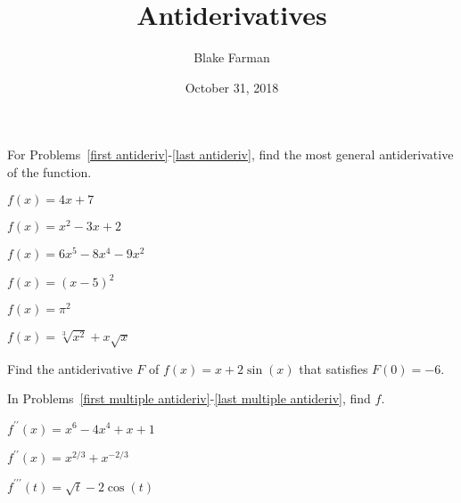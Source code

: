 \documentclass[10pt]{amsart}
\title{Antiderivatives}
\date{October 31, 2018}
\author{Blake Farman}
\begin{document}
\maketitle

\makenameslot

For Problems~\eqref{first antideriv}-\eqref{last antideriv}, find the most general antiderivative of the function.
\begin{multicols}{3}
\begin{thm}\label{first antideriv}
  \(f(x) = 4x + 7\)
\end{thm}

\begin{thm}
  \(f(x) = x^2 - 3x + 2\)
\end{thm}

\begin{thm}
  \(f(x) = 6x^5 - 8x^4 - 9x^2\)
\end{thm}
\end{multicols}

\vspace{2in}

\begin{multicols}{3}
  \begin{thm}
    \(f(x) = (x - 5)^2\)
  \end{thm}

  \begin{thm}
    \(f(x) = \pi^2\)
  \end{thm}

  \begin{thm}\label{last antideriv}
    \(f(x) = \sqrt[3]{x^2} + x\sqrt{x}\)
  \end{thm}
\end{multicols}

\newpage

\begin{thm}
  Find the antiderivative \(F\) of \(f(x) = x + 2\sin(x)\) that satisfies \(F(0) = -6\).
\end{thm}

\vspace{3in}

In Problems~\eqref{first multiple antideriv}-\eqref{last multiple antideriv}, find \(f\).
\begin{multicols}{3}
  \begin{thm}\label{first multiple antideriv}
    \(f^{\prime\prime}(x) = x^6 - 4x^4 + x + 1\)
  \end{thm}

  \begin{thm}
    \(f^{\prime\prime}(x) = x^{2/3} + x^{-2/3}\)
  \end{thm}

  \begin{thm}\label{last multiple antideriv}
    \(f^{\prime\prime\prime}(t) = \sqrt{t} - 2\cos(t)\)
  \end{thm}
\end{multicols}
\end{document}
